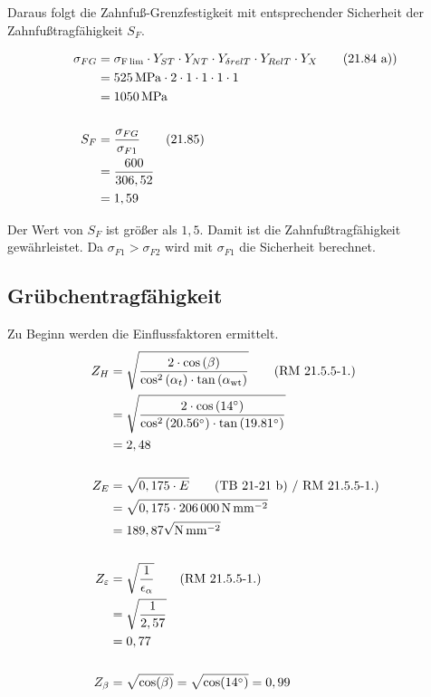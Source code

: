 \documentclass[15pt,a4paper]{article}
\begin{document}
     Daraus folgt die Zahnfuß-Grenzfestigkeit mit entsprechender Sicherheit der Zahnfußtragfähigkeit $S_F$.
     
     \begin{align*}
     	\sigma_{FG}&=\sigma_{\rm F\, lim} \cdot Y_{ST} \cdot Y_{NT}\cdot Y_{\delta rel T}\cdot Y_{RelT} \cdot Y_X \tag{21.84 a)}\\
     	&= \SI{525}{\mega\pascal} \cdot 2 \cdot 1 \cdot 1 \cdot 1 \cdot 1 \\
     	&= \SI{1050}{\mega\pascal} \\\\
     	S_F&=\dfrac{\sigma_{FG}}{\sigma_{F1}} \tag{21.85}\\
     	&=\frac{600}{306,52} \\
     	&=1,59
     \end{align*}
     
     Der Wert von $S_F$ ist größer als $1,5$. Damit ist die Zahnfußtragfähigkeit gewährleistet. Da $ \sigma_{F1} > \sigma_{F2} $ wird mit $ \sigma_{F1} $ die Sicherheit berechnet.
     
     \subsection{Grübchentragfähigkeit}
     Zu Beginn werden die Einflussfaktoren ermittelt.
     \begin{align*}
     	Z_H &=\sqrt{\dfrac{2 \cdot \cos\left(\beta\right)}{\cos^{2}\left(\alpha_{t}\right) \cdot \tan\left(\alpha_{\rm wt}\right)}} \tag{RM 21.5.5-1.} \\
     	&= \sqrt{\dfrac{2 \cdot \cos\left(\ang{14}\right)}{\cos^{2}\left(\ang{20,56}\right) \cdot \tan\left(\ang{19,81}\right)}} \\
     	&=2,48\\\\
     	Z_E&=\sqrt{0,175 \cdot E} \tag{TB 21-21 b) / RM 21.5.5-1.} \\
     	&= \sqrt{0,175 \cdot \SI{206000}{\newton\per\milli\m\squared}}\\
     	&= 189,87 \sqrt{\si{\newton\per\milli\m\squared}}\\\\
     	Z_\varepsilon &=\sqrt{\frac{1}{\epsilon_{\alpha}}} \tag{RM 21.5.5-1.}\\
     	&= 	\sqrt{\frac{1}{2,57}} \\
     	&= 0,77\\\\
     	Z_\beta&=\sqrt{\cos(\beta)}=\sqrt{\cos(\ang{14})} = 0,99
     \end{align*}
     
\end{document}
